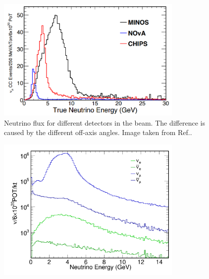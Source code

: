 \begin{figure} %
    \includegraphics[width=0.8\textwidth]{diagrams/5-chips/numi_axis.png}
    \caption[Neutrino flux for different detectors in the \numi beam.]
    {Neutrino flux for different detectors in the \numi beam.
        The difference is caused by the different off-axis angles.
        Image taken from Ref.\cite{adamson2013}.}
    \label{fig:numi_axis}
\end{figure} %

\begin{figure} %
    \includegraphics[width=0.8\textwidth]{diagrams/5-chips/flux.png}
    \caption[flux short]
    {}
    \label{fig:flux}
\end{figure} %


